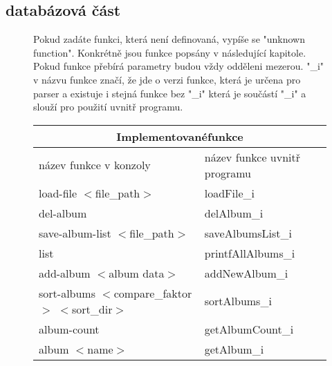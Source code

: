 \documentclass{article}
\begin{document}
\subsection{databázová část}
\begin{figure}[H]
    \begin{minipage}[t]{0.3\textwidth}
        Pokud zadáte funkci, která není definovaná, vypíše se "unknown function".
        Konkrétně jsou funkce popsány v následující kapitole.
        Pokud funkce přebírá parametry budou vždy odděleni mezerou. 
        "\_i" v názvu funkce značí, že jde o verzi funkce, která je určena pro parser a existuje i stejná funkce bez "\_i" která je součástí "\_i" a slouží pro použití uvnitř programu.
    \end{minipage}
    \hfill
	\begin{minipage}[t]{0.65\textwidth}
        \vspace{-10mm}
        \begin{tabular}{|l|l|}
            \hline
            \multicolumn{2}{|c|}{Implementované\;funkce} \\ \hline 
            \rowcolor{tabGreen}
            název funkce v konzoly                              & název funkce uvnitř programu   \\ \hline    
            load-file $<$file\_path$>$                          & loadFile\_i                    \\ \hline    \rowcolor{tabYellow}
            del-album                                           & delAlbum\_i                    \\ \hline    
            save-album-list $<$file\_path$>$                    & saveAlbumsList\_i              \\ \hline    \rowcolor{tabYellow}
            list                                                & printfAllAlbums\_i             \\ \hline    
            add-album $<$album data$>$                          & addNewAlbum\_i                 \\ \hline    \rowcolor{tabYellow}
            sort-albums $<$compare\_faktor$>$ $<$sort\_dir$>$   & sortAlbums\_i                  \\ \hline    
            album-count                                         & getAlbumCount\_i               \\ \hline    \rowcolor{tabYellow}
            album $<$name$>$                                    & getAlbum\_i                    \\ \hline    

\end{tabular}
\end{minipage}
\end{figure}
\end{document}
